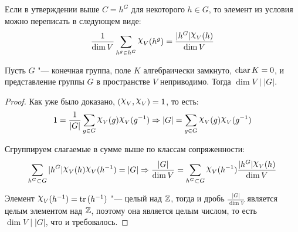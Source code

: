 \begin{note}
	Если в утверждении выше $C = h^G$ для некоторого $h \in G$, то элемент из условия можно переписать в следующем виде:
	\[\frac1{\dim{V}}\sum_{h^g \in h^G}\Chi_V(h^g) = \frac{|h^G|\Chi_V(h)}{\dim V}\]
\end{note}

\begin{theorem}
	Пусть $G$ "--- конечная группа, поле $K$ алгебраически замкнуто, $\operatorname{char}{K} = 0$, и представление группы $G$ в пространстве $V$ неприводимо. Тогда $\dim{V} \mid |G|$.
\end{theorem}

\begin{proof}
	Как уже было доказано, $(\Chi_V, \Chi_V) = 1$, то есть:
	\[1 = \frac1{|G|}\sum_{g \in G}\Chi_V(g)\Chi_V(g^{-1}) \ra |G| = \sum_{g \in G}\Chi_V(g)\Chi_V(g^{-1})\]
	
	Сгруппируем слагаемые в сумме выше по классам сопряженности:
	\[\sum_{h^G \subset G}|h^G|\Chi_V(h)\Chi_V(h^{-1}) = |G| \ra \frac{|G|}{\dim{V}} = \sum_{h^G\subset G}\Chi_V(h^{-1})\frac{|h^G|\Chi_V(h)}{\dim{V}}\]
	
	Элемент $\Chi_V(h^{-1}) = \tr{(h^{-1})}$ "--- целый над $\mathbb{Z}$, тогда и дробь $\frac{|G|}{\dim{V}}$ является целым элементом над $\mathbb{Z}$, поэтому она является целым числом, то есть $\dim{V} \mid |G|$, что и требовалось.
\end{proof}